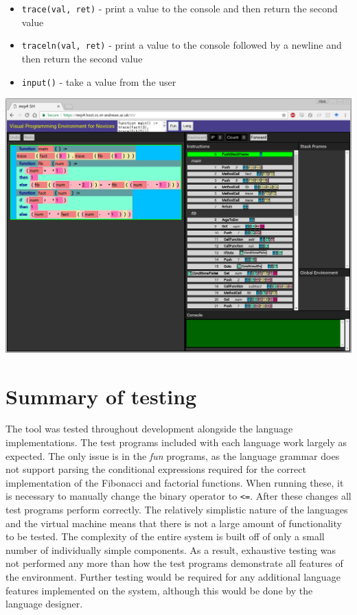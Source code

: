 \documentclass[12pt,a4paper]{report}
\begin{document}
\begin{itemize}
\item \verb+trace(val, ret)+ - print a value to the console and then return the second value
\item \verb+traceln(val, ret)+ - print a value to the console followed by a newline and then return the second value
\item \verb+input()+ - take a value from the user
\end{itemize}

\includegraphics[width=\textwidth]{graphics/ui}

\chapter{Summary of testing}

The tool was tested throughout development alongside the language implementations. The test programs included with each language work largely as expected. The only issue is in the \textit{fun} programs, as the language grammar does not support parsing the conditional expressions required for the correct implementation of the Fibonacci and factorial functions. When running these, it is necessary to manually change the binary operator to \verb+<=+. After these changes all test programs perform correctly. The relatively simplistic nature of the languages and the virtual machine means that there is not a large amount of functionality to be tested. The complexity of the entire system is built off of only a small number of individually simple components. As a result, exhaustive testing was not performed any more than how the test programs demonstrate all features of the environment. Further testing would be required for any additional language features implemented on the system, although this would be done by the language designer.
\end{document}
